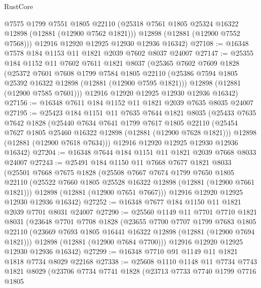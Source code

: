 \begin{lexlean}{RustCore}
\begin{coremodule}
        @7575
        @1799
        @7551
        @1805
        @22110
        (@25318 @7561 @1805 @25324 @16322 @12898 (@12881 (@12900 @7562 @1821)))
        @12898
        (@12881 (@12900 @7552 @7568)))
      @12916
      @12920
      @12925
      @12930
      @12936
      @16342)
@27108 := @16348 @7578 @184 @1153 @11 @1821 @2039 @7602 @8037 @24007
@27147 := @25355
    @184
    @1152
    @11
    @7602
    @7611
    @1821
    @8037
    (@25365
      @7602
      @7609
      @1828
      (@25372
        @7601
        @7608
        @1799
        @7584
        @1805
        @22110
        (@25386 @7594 @1805 @25392 @16322 @12898 (@12881 (@12900 @7595 @1821)))
        @12898
        (@12881 (@12900 @7585 @7601)))
      @12916
      @12920
      @12925
      @12930
      @12936
      @16342)
@27156 := @16348 @7611 @184 @1152 @11 @1821 @2039 @7635 @8035 @24007
@27195 := @25423
    @184
    @1151
    @11
    @7635
    @7644
    @1821
    @8035
    (@25433
      @7635
      @7642
      @1828
      (@25440
        @7634
        @7641
        @1799
        @7617
        @1805
        @22110
        (@25454 @7627 @1805 @25460 @16322 @12898 (@12881 (@12900 @7628 @1821)))
        @12898
        (@12881 (@12900 @7618 @7634)))
      @12916
      @12920
      @12925
      @12930
      @12936
      @16342)
@27204 := @16348 @7644 @184 @1151 @11 @1821 @2039 @7668 @8033 @24007
@27243 := @25491
    @184
    @1150
    @11
    @7668
    @7677
    @1821
    @8033
    (@25501
      @7668
      @7675
      @1828
      (@25508
        @7667
        @7674
        @1799
        @7650
        @1805
        @22110
        (@25522 @7660 @1805 @25528 @16322 @12898 (@12881 (@12900 @7661 @1821)))
        @12898
        (@12881 (@12900 @7651 @7667)))
      @12916
      @12920
      @12925
      @12930
      @12936
      @16342)
@27252 := @16348 @7677 @184 @1150 @11 @1821 @2039 @7701 @8031 @24007
@27290 := @25560
    @1149
    @11
    @7701
    @7710
    @1821
    @8031
    (@23648
      @7701
      @7708
      @1828
      (@23655
        @7700
        @7707
        @1799
        @7683
        @1805
        @22110
        (@23669 @7693 @1805 @16441 @16322 @12898 (@12881 (@12900 @7694 @1821)))
        @12898
        (@12881 (@12900 @7684 @7700)))
      @12916
      @12920
      @12925
      @12930
      @12936
      @16342)
@27299 := @16348 @7710 @91 @1149 @11 @1821 @1818 @7734 @8029 @22168
@27338 := @25608
    @1110
    @1148
    @11
    @7734
    @7743
    @1821
    @8029
    (@23706
      @7734
      @7741
      @1828
      (@23713
        @7733
        @7740
        @1799
        @7716
        @1805

\end{coremodule}
\end{lexlean}
